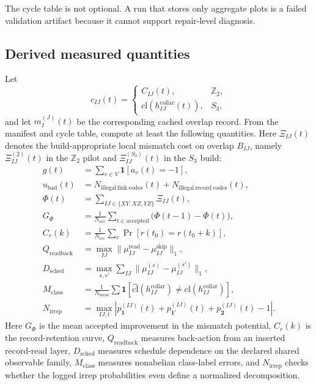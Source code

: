 \documentclass[11pt]{article}
\begin{document}
The cycle table is not optional. A run that stores only aggregate plots is a failed validation
artifact because it cannot support repair-level diagnosis.

\subsection{Derived measured quantities}

Let
\begin{equation}
c_{IJ}(t)=
\begin{cases}
C_{IJ}(t), & \mathbb Z_2,\\
\mathrm{cl}(h_{IJ}^{\mathrm{collar}}(t)), & S_3,
\end{cases}
\end{equation}
and let $m_I^{(J)}(t)$ be the corresponding cached overlap record. From the manifest and cycle
table, compute at least the following quantities. Here $\Xi_{IJ}(t)$ denotes the
build-appropriate local mismatch cost on overlap $B_{IJ}$, namely
$\Xi_{IJ}^{(2)}(t)$ in the $\mathbb Z_2$ pilot and $\Xi_{IJ}^{(S_3)}(t)$ in the
$S_3$ build:
\begin{align}
g(t) &= \sum_{v\in V}\mathbf 1[a_v(t)=-1],\\
u_{\mathrm{bad}}(t) &= N_{\mathrm{illegal\ link\ codes}}(t)+N_{\mathrm{illegal\ record\ codes}}(t),\\
\Phi(t) &= \sum_{IJ\in\{XY,XZ,YZ\}}\Xi_{IJ}(t),\\
G_{\Phi} &= \frac{1}{N_{\mathrm{acc}}}\sum_{t\in \mathrm{accepted}}\bigl(\Phi(t-1)-\Phi(t)\bigr),\\
C_r(k) &= \frac{1}{N_{\mathrm{rec}}}\sum_r \Pr[r(t_0)=r(t_0+k)],\\
Q_{\mathrm{readback}} &= \max_{IJ}\|\mu_{IJ}^{\mathrm{read}}-\mu_{IJ}^{\mathrm{skip}}\|_1,\\
D_{\mathrm{sched}} &= \max_{s,s'}\sum_{IJ}\|\mu_{IJ}^{(s)}-\mu_{IJ}^{(s')}\|_1,\\
M_{\mathrm{class}} &= \frac{1}{N_{\mathrm{meas}}}\sum \mathbf 1[\widehat{\mathrm{cl}}(h_{IJ}^{\mathrm{collar}})\neq \mathrm{cl}(h_{IJ}^{\mathrm{collar}})],\\
N_{\mathrm{irrep}} &= \max_{IJ,t}\left|p_{\mathbf 1}^{(IJ)}(t)+p_{\mathbf 1'}^{(IJ)}(t)+p_{\mathbf 2}^{(IJ)}(t)-1\right|.
\end{align}
Here $G_{\Phi}$ is the mean accepted improvement in the mismatch potential, $C_r(k)$ is the
record-retention curve, $Q_{\mathrm{readback}}$ measures back-action from an inserted record-read
layer, $D_{\mathrm{sched}}$ measures schedule dependence on the declared shared observable
family, $M_{\mathrm{class}}$ measures nonabelian class-label errors, and $N_{\mathrm{irrep}}$
checks whether the logged irrep probabilities even define a normalized decomposition.
\end{document}
